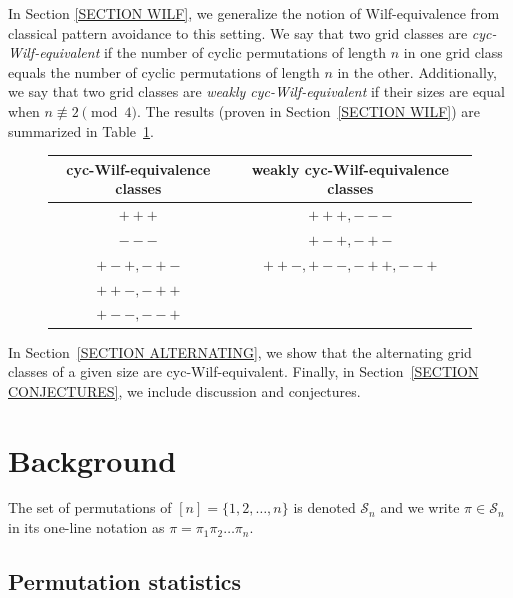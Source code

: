 \documentclass[12pt]{article}
\theoremstyle{plain}
\theoremstyle{definition}
\begin{document}
In Section \ref{SECTION WILF}, 
we generalize the notion of Wilf-equivalence from classical pattern avoidance to this setting. We say that two grid classes are \textit{cyc-Wilf-equivalent} if the number of cyclic permutations of length $n$ in one grid class equals the number of cyclic permutations of length $n$ in the other. Additionally, we say that two grid classes are \textit{weakly cyc-Wilf-equivalent} if their sizes are equal when $n\not\equiv 2\!\pmod 4$. The results (proven in Section~\ref{SECTION WILF}) are summarized in Table~\ref{FIGURE WILF RESULTS}. 

\begin{figure}[h]
\centering
\begin{tabular}{c||c}
cyc-Wilf-equivalence classes & weakly cyc-Wilf-equivalence classes \\ \hline
$+++$ & $+++,---$ \\
$---$ & $+-+, -+-$ \\ 
$+-+, -+-$ & $++-, +--, -++, --+$ \\
$++-, -++$ & \\
$+--, --+$ & \\
\end{tabular}
\label{FIGURE WILF RESULTS}
\end{figure}


	
	 In Section~\ref{SECTION ALTERNATING}, we show that the alternating grid classes of a given size are cyc-Wilf-equivalent. Finally, in Section~\ref{SECTION CONJECTURES}, we include discussion and conjectures.






\section{Background}\label{SECTION BACKGROUND}

The set of permutations of $[n]=\{1,2, \ldots, n\}$ is denoted $\mathcal S_n$ and we write $\pi \in \mathcal S_n$ in its one-line notation as $\pi=\pi_1\pi_2\ldots\pi_n$.  

\subsection{Permutation statistics}
\end{document}
